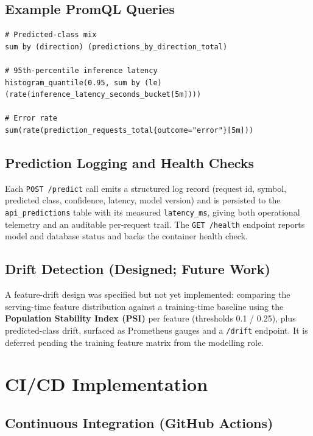 \documentclass[11pt,a4paper]{article}
\begin{document}
\subsection{Example PromQL Queries}

\begin{lstlisting}[style=yaml, caption={Representative monitoring queries}]
# Predicted-class mix
sum by (direction) (predictions_by_direction_total)

# 95th-percentile inference latency
histogram_quantile(0.95, sum by (le) (rate(inference_latency_seconds_bucket[5m])))

# Error rate
sum(rate(prediction_requests_total{outcome="error"}[5m]))
\end{lstlisting}

\subsection{Prediction Logging and Health Checks}

Each \texttt{POST /predict} call emits a structured log record (request id,
symbol, predicted class, confidence, latency, model version) and is persisted to
the \texttt{api\_predictions} table with its measured \texttt{latency\_ms},
giving both operational telemetry and an auditable per-request trail. The
\texttt{GET /health} endpoint reports model and database status and backs the
container health check.

\subsection{Drift Detection (Designed; Future Work)}

A feature-drift design was specified but not yet implemented: comparing the
serving-time feature distribution against a training-time baseline using the
\textbf{Population Stability Index (PSI)} per feature (thresholds 0.1 / 0.25),
plus predicted-class drift, surfaced as Prometheus gauges and a \texttt{/drift}
endpoint. It is deferred pending the training feature matrix from the modelling
role.


\section{CI/CD Implementation}
\label{sec:cicd}

\subsection{Continuous Integration (GitHub Actions)}
\end{document}
